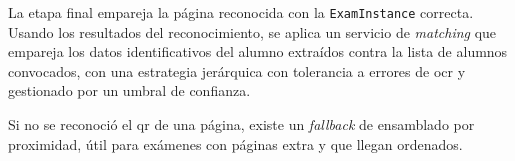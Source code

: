 La etapa final empareja la página reconocida con la \texttt{ExamInstance}
correcta. Usando los resultados del reconocimiento, se aplica un servicio
de \textit{matching} que empareja los datos identificativos del alumno
extraídos contra la lista de alumnos convocados, con una estrategia
jerárquica con tolerancia a errores de \acs{ocr} y gestionado por un
umbral de confianza.

Si no se reconoció el \acs{qr} de una página, existe un \textit{fallback}
de ensamblado por proximidad, útil para exámenes con páginas extra y que
llegan ordenados.
